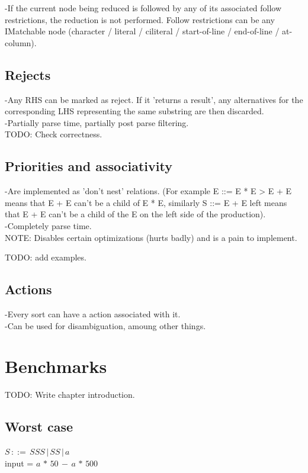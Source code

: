 \documentclass[a4paper,10pt]{article}
\begin{document}
-If the current node being reduced is followed by any of its associated follow restrictions, the reduction is not performed. Follow restrictions can be any IMatchable node (character / literal / ciliteral / start-of-line / end-of-line / at-column).

\subsection{Rejects}

-Any RHS can be marked as reject. If it 'returns a result', any alternatives for the corresponding LHS representing the same substring are then discarded.\\
-Partially parse time, partially post parse filtering. \\
TODO: Check correctness.

\subsection{Priorities and associativity}

-Are implemented as 'don't nest' relations. (For example E ::= E * E > E + E means that E + E can't be a child of E * E, similarly S ::= E + E {left} means that E + E can't be a child of the E on the left side of the production).\\
-Completely parse time.\\
NOTE: Disables certain optimizations (hurts badly) and is a pain to implement.

TODO: add examples.

\subsection{Actions}

-Every sort can have a action associated with it.\\
-Can be used for disambiguation, amoung other things.

\section{Benchmarks}

TODO: Write chapter introduction.

\subsection{Worst case}

$S\,::=\,SSS\,|\,SS\,|\,a$\\
input = $a\,*\,50\,-\,a\,*\,500$
\end{document}
